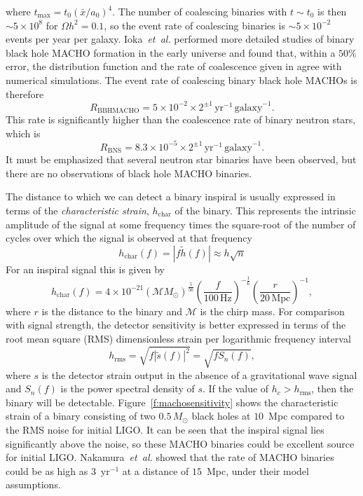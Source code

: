 where $t_\mathrm{max} = t_0(\bar{x}/a_0)^4$. The number of coalescing binaries
with $t \sim t_0$ is then $\sim 5 \times 10^{8}$ for $\Omega h^2 = 0.1$, so
the event rate of coalescing binaries is $\sim 5 \times 10^{-2}$ events per
year per galaxy. Ioka~\emph{et~al.} performed more detailed studies of binary
black hole MACHO formation in the early universe\cite{Ioka:1998nz} and found
that, within a $50\%$ error, the distribution function and the rate of
coalescence given in \cite{Nakamura:1997sm} agree with numerical simulations.
The event rate of coalescing binary black hole MACHOs is therefore
\begin{equation}
R_\mathrm{BBHMACHO} = 5\times 10^{-2}\times 2^{\pm
1}\,\mathrm{yr}^{-1}\,\mathrm{galaxy}^{-1}.
\end{equation}
This rate is significantly higher than the coalescence rate of
binary neutron stars, which is\cite{Kalogera:2004tn}
\begin{equation}
R_\mathrm{BNS} = 8.3\times 10^{-5}\times 2^{\pm
1}\,\mathrm{yr}^{-1}\,\mathrm{galaxy}^{-1}.
\end{equation}
It must be emphasized that several neutron star binaries have been
observed, but there are no observations of black hole MACHO binaries.

The distance to which we can detect a binary inspiral is usually expressed in
terms of the \emph{characteristic strain}, $h_\mathrm{char}$ of the binary. This
represents the intrinsic amplitude of the signal at some frequency times the
square-root of the number of cycles over which the signal is observed at that
frequency
\begin{equation}
h_\mathrm{char}(f) = |f \tilde{h}(f)| \approx h \sqrt{n}
\end{equation}
 For an inspiral signal this is given by\cite{Thorne:1982cv}
\begin{equation}
h_\mathrm{char}(f)  =  4 \times 10^{-21} \left(\mathcal{M}{M_\odot}\right)^\frac{5}{56}
\left(\frac{f}{100\,\mathrm{Hz}}\right)^{-\frac{1}{6}} \left(\frac{r}{20\,
\mathrm{Mpc}}\right)^{-1},
\end{equation}
where $r$ is the distance to the binary and $\mathcal{M}$ is the chirp mass.
For comparison with signal strength, the detector sensitivity is better
expressed in terms of the root mean square (RMS) dimensionless strain per
logarithmic frequency interval
\begin{equation}
h_\mathrm{rms} = \sqrt{f |\tilde{s}(f)|^2} = \sqrt{f S_n(f)},
\end{equation}
where $s$ is the detector strain output in the absence of a gravitational wave
signal and $S_n(f)$ is the power spectral density of $s$. If the value of $h_c
> h_\mathrm{rms}$, then the binary will be
detectable. Figure~\ref{f:machosensitivity} shows the characteristic strain of
a binary consisting of two $0.5\,M_\odot$ black holes at $10$~Mpc compared to
the RMS noise for initial LIGO. It can be seen that the inspiral signal lies
significantly above the noise, so these MACHO binaries could be excellent
source for initial LIGO. Nakamura~\emph{et~al.} showed that the rate of MACHO
binaries could be as high as $3$~yr$^{-1}$ at a distance of
$15$~Mpc\cite{Nakamura:1997sm}, under their model assumptions.

